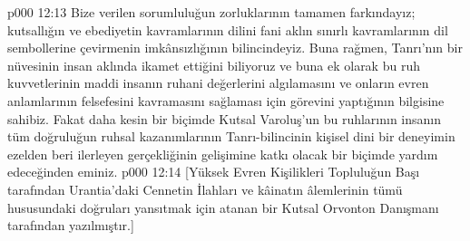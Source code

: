 \vs p000 12:13 Bize verilen sorumluluğun zorluklarının tamamen farkındayız; kutsallığın ve ebediyetin kavramlarının dilini fani aklın sınırlı kavramlarının dil sembollerine çevirmenin imkânsızlığının bilincindeyiz. Buna rağmen, Tanrı’nın bir nüvesinin insan aklında ikamet ettiğini biliyoruz ve buna ek olarak bu ruh kuvvetlerinin maddi insanın ruhani değerlerini algılamasını ve onların evren anlamlarının felsefesini kavramasını sağlaması için görevini yaptığının bilgisine sahibiz. Fakat daha kesin bir biçimde Kutsal Varoluş’un bu ruhlarının insanın tüm doğruluğun ruhsal kazanımlarının Tanrı\hyp{}bilincinin kişisel dini bir deneyimin ezelden beri ilerleyen gerçekliğinin gelişimine katkı olacak bir biçimde yardım edeceğinden eminiz.
\vs p000 12:14 [Yüksek Evren Kişilikleri Topluluğun Başı tarafından Urantia’daki Cennetin İlahları ve kâinatın âlemlerinin tümü hususundaki doğruları yansıtmak için atanan bir Kutsal Orvonton Danışmanı tarafından yazılmıştır.]
